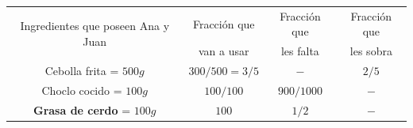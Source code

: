 \documentclass[11pt]{examdesign}
\theoremstyle{plain}
\theoremstyle{definition}
\theoremstyle{remark}
\begin{document}
\begin{shortanswer}[title={\textit{Receta que le dijo la Abuela Pocha a Ana y
    			Juan.}},
    	rearrange=no,resetcounter=no]
\begin{question}
\begin{answer}
    		   \begin{center}
    		   	\begin{tabular}{|c|c|c|c|}
    		   		\hline 
    		   		\multirow{2}{*}{Ingredientes que poseen Ana y Juan} &Fracción que&
    		   		Fracción que&Fracción que
    		   		\\
    		   		&  van a usar   &les falta   & les sobra
    		   		\\\hline  
    		   		Cebolla frita = $500g$    & $300/500=3/5$ & $-$        & $2/5$   
    		   		\\\hline
    		   		Choclo cocido = $100g$    & $100/100$     & $900/1000$ & $-$    
    		   		\\\hline
    		   		\textbf{Grasa de cerdo} = $100g$          &   $100$    & $1/2$ &$-$          
    		   		\\\hline
    		   	\end{tabular}
    		   \end{center}
    		\end{answer}
    	\end{question}
        
    \end{shortanswer}
\end{document}
